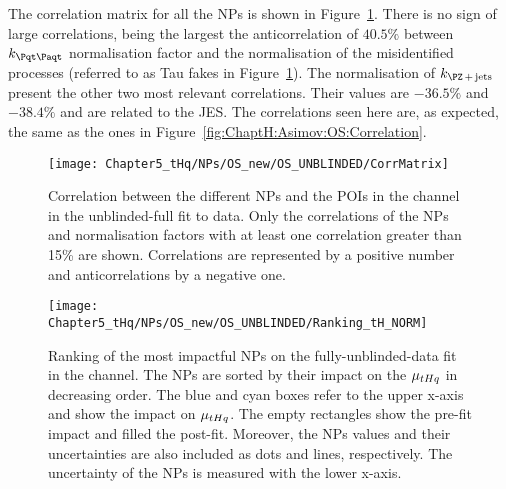 The correlation matrix for all the NPs is shown in Figure~\ref{fig:ChaptH:fitToData:OS:Correlation}. 
There is no sign of large correlations, being the largest the anticorrelation of $40.5\%$ between $k_{\ttbar}$ 
normalisation factor and the normalisation of the misidentified processes (referred to as Tau fakes in 
Figure~\ref{fig:ChaptH:fitToData:OS:Correlation}). The normalisation of $k_{\Zjets}$ present the other
two most relevant correlations. Their values are $-36.5\%$ and $-38.4\%$ and are related to the JES.
The correlations seen here are, as expected, the same as the ones in Figure~\ref{fig:ChaptH:Asimov:OS:Correlation}.

 

\begin{figure}[h]
\centering
 \texttt{[image: Chapter5\_tHq/NPs/OS\_new/OS\_UNBLINDED/CorrMatrix]}
\caption{Correlation between the different NPs and the POIs in the \dilepOStau channel in the unblinded-full fit to data. 
Only the correlations of the NPs and normalisation factors with at least one correlation greater than 15\% are shown.
Correlations are represented by a positive number and anticorrelations by a negative one.} 
\label{fig:ChaptH:fitToData:OS:Correlation}
\end{figure}


\begin{figure}[h]%
    \centering
        \texttt{[image: Chapter5\_tHq/NPs/OS\_new/OS\_UNBLINDED/Ranking\_tH\_NORM]}
    \caption{Ranking of the most impactful NPs on the fully-unblinded-data fit in the \dilepOStau channel. 
    The NPs are sorted by their impact on the $\mu_{tHq}$ in decreasing order. 
    The blue and cyan boxes refer to the upper x-axis and show the impact on $\mu_{tHq}$.
    The empty rectangles show the pre-fit impact and filled the post-fit. 
    Moreover, the NPs values and their uncertainties are also included as dots and 
    lines, respectively. The uncertainty of the NPs is measured with the lower x-axis.}
    \label{fig:ChaptH:fitToData:OS:Ranking}
\end{figure}


